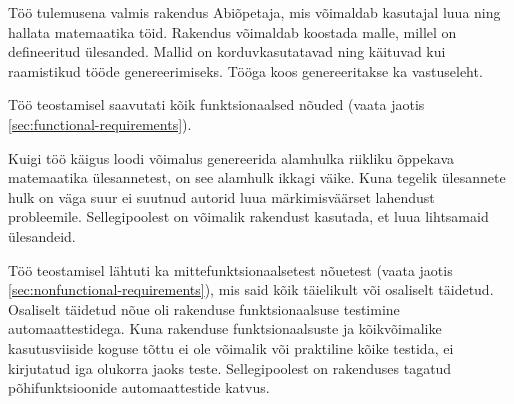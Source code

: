 Töö tulemusena valmis rakendus Abiõpetaja, mis võimaldab kasutajal luua ning hallata matemaatika töid. Rakendus võimaldab koostada malle, millel on defineeritud ülesanded. Mallid on korduvkasutatavad ning käituvad kui raamistikud tööde genereerimiseks. Tööga koos genereeritakse ka vastuseleht.

Töö teostamisel saavutati kõik funktsionaalsed nõuded (vaata jaotis \ref{sec:functional-requirements}).

Kuigi töö käigus loodi võimalus genereerida alamhulka riikliku õppekava matemaatika ülesannetest, on see alamhulk ikkagi väike. Kuna tegelik ülesannete hulk on väga suur ei suutnud autorid luua märkimisväärset lahendust probleemile. Sellegipoolest on võimalik rakendust kasutada, et luua lihtsamaid ülesandeid.

Töö teostamisel lähtuti ka mittefunktsionaalsetest nõuetest (vaata jaotis \ref{sec:nonfunctional-requirements}), mis said kõik täielikult või osaliselt täidetud. Osaliselt täidetud nõue oli rakenduse funktsionaalsuse testimine automaattestidega. Kuna rakenduse funktsionaalsuste ja kõikvõimalike kasutusviiside koguse tõttu ei ole võimalik või praktiline kõike testida, ei kirjutatud iga olukorra jaoks teste. Sellegipoolest on rakenduses tagatud põhifunktsioonide automaattestide katvus.
